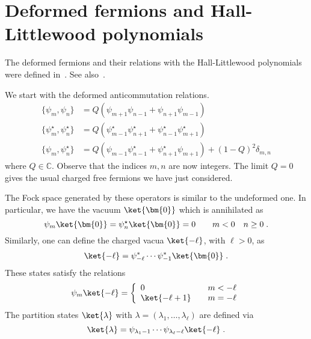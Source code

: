 \section{Deformed fermions and Hall-Littlewood polynomials}

The deformed fermions and their relations with the Hall-Littlewood
polynomials were defined in~\cite{Jing1991, Jing1995}.
See also~\cite{Foda:2008hn, Wheeler:2010vmq, Sulkowski:2008mx}.

We start with the deformed anticommutation relations.
\begin{equation}
\begin{split} 
\{\psi_m, \psi_n\} &= Q\left( \psi_{m + 1} \psi_{n-1} + \psi_{n+1} \psi_{m-1} \right)\\
\{\psi_m^\star, \psi_n^\star\} &= Q\left( \psi_{m-1}^\star \psi_{n+1}^\star
+ \psi_{n-1}^\star \psi_{m+1}^\star \right)\\
\{\psi_m, \psi_n^\star\} &= Q\left( \psi_{m-1} \psi_{n-1}^\star
+ \psi_{n+1}^\star \psi_{m+1} \right) + (1-Q)^2\delta_{m,n}
\end{split}	
\end{equation}
where \(Q\in \mathbb{C}\). Observe that the indices \(m, n\) are now
integers. The limit \(Q=0\) gives the usual charged free fermions we
have just considered.

The Fock space generated by these operators is similar to the
undeformed one. In particular, we have the vacuum \(\ket{\bm{0}}\)
which is annihilated as
\begin{equation}
\psi_m \ket{\bm{0}} = \psi_{n}^\star \ket{\bm{0}} = 0 \qquad  m < 0 \quad n \geq 0\; .
\end{equation}
Similarly, one can define the charged vacua \(\ket{-\ell}\), with \(\ell > 0\), as
\begin{equation}
\begin{split}
\ket{-\ell} = \psi^\ast_{-\ell}\cdots \psi^\ast_{-1}\ket{\bm{0}}\; .
\end{split}
\end{equation}
These states satisfy the relations
\begin{equation}
  \psi_m\ket{-\ell} = \left\{
\begin{array}{ll}
 0 & \quad m < -\ell\\
 \ket{-\ell + 1} & \quad m = -\ell\\
\end{array}
\right.
\end{equation}
The partition states \(\ket{\lambda}\) with \(\lambda = (\lambda_1,
\dots, \lambda_\ell)\) are defined via
\begin{equation}
\ket{\lambda} = \psi_{\lambda_1 - 1} \cdots \psi_{\lambda_\ell - \ell}\ket{-\ell}\; .
\end{equation}

